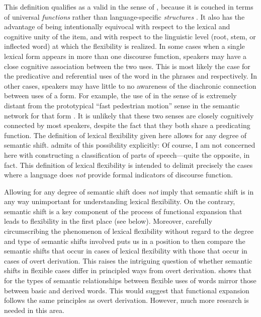 This definition qualifies as a valid  in the sense of \textcite{Haspelmath2010a}, because it is couched in terms of universal \emph{functions} rather than language-specific \emph{structures} \parencite{Croft2016}. It also has the advantage of being intentionally equivocal with respect to the lexical and cognitive unity of the item, and with respect to the linguistic level (root, stem, or inflected word) at which the flexibility is realized. In some cases when a single lexical form appears in more than one discourse function, speakers may have a close cognitive association between the two uses. This is most likely the case for the predicative and referential uses of the word  in the phrases  and  respectively. In other cases, speakers may have little to no awareness of the diachronic connection between uses of a form. For example, the use of  in the sense of  is extremely distant from the prototypical \enquote{fast pedestrian motion} sense in the semantic network for that form . It is unlikely that these two senses are closely cognitively connected by most speakers, despite the fact that they both share a predicating function. The definition of lexical flexibility given here allows for any degree of semantic shift. \citeauthor{Croft2001b} admits of this possibility explicitly:  Of course, I am not concerned here with constructing a classification of parts of speech—quite the opposite, in fact. This definition of lexical flexibility is intended to delimit precisely the cases where a language does \emph{not} provide formal indicators of discourse function.

Allowing for any degree of semantic shift does \emph{not} imply that semantic shift is in any way unimportant for understanding lexical flexibility. On the contrary, semantic shift is a key component of the process of functional expansion that leads to flexibility in the first place (see below). Moreover, carefully circumscribing the phenomenon of lexical flexibility without regard to the degree and type of semantic shifts involved puts us in a position to then compare the semantic shifts that occur in cases of lexical flexibility with those that occur in cases of overt derivation. This raises the intriguing question of whether semantic shifts in flexible cases differ in principled ways from overt derivation. \textcite[165]{Mithun2017} shows that for  the types of semantic relationships between flexible uses of words mirror those between basic and derived words. This would suggest that functional expansion follows the same principles as overt derivation. However, much more research is needed in this area.

